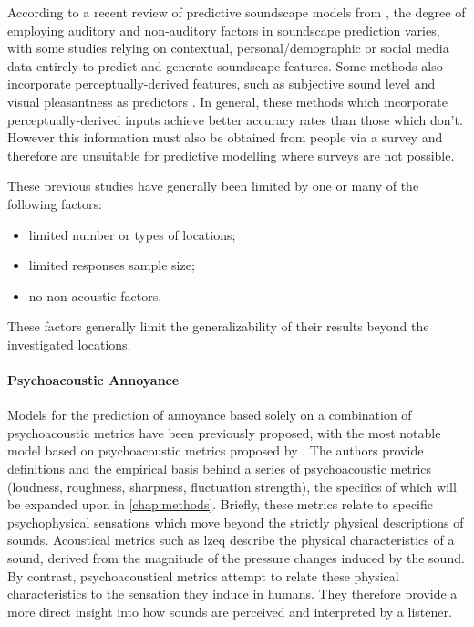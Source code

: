 According to a recent review of predictive soundscape models from \citet{Lionello2020systematic}, the degree of employing auditory and non-auditory factors in soundscape prediction varies, with some studies relying on contextual, personal/demographic \citep{Erfanian2021Psychological,Tarlao2020Investigating} or social media \citep{Aiello2016Chatty} data entirely to predict and generate soundscape features. Some methods also incorporate perceptually-derived features, such as subjective sound level and visual pleasantness as predictors \citep{Lionello2020systematic}. In general, these methods which incorporate perceptually-derived inputs achieve better accuracy rates than those which don't. However this information must also be obtained from people via a survey and therefore are unsuitable for predictive modelling where surveys are not possible. 

These previous studies have generally been limited by one or many of the following factors:

\begin{itemize}
  \item limited number or types of locations;
  \item limited responses sample size;
  \item no non-acoustic factors.
\end{itemize}
These factors generally limit the generalizability of their results beyond the investigated locations.

\paragraph*{Psychoacoustic Annoyance }Models for the prediction of annoyance based solely on a combination of psychoacoustic metrics have been previously proposed, with the most notable model based on psychoacoustic metrics proposed by \citet{PsychoacousticsfactsmodelsZwicker}. The authors provide definitions and the empirical basis behind a series of psychoacoustic metrics (loudness, roughness, sharpness, fluctuation strength), the specifics of which will be expanded upon in \cref{chap:methods}. Briefly, these metrics relate to specific psychophysical sensations which move beyond the strictly physical descriptions of sounds. Acoustical metrics such as \gls{lzeq} describe the physical characteristics of a sound, derived from the magnitude of the pressure changes induced by the sound. By contrast, psychoacoustical metrics attempt to relate these physical characteristics to the sensation they induce in humans. They therefore provide a more direct insight into how sounds are perceived and interpreted by a listener. 

